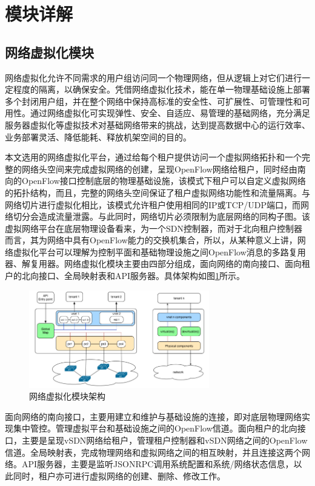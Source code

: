 \section{模块详解}
\subsection{网络虚拟化模块}
网络虚拟化允许不同需求的用户组访问同一个物理网络，但从逻辑上对它们进行一定程度的隔离，以确保安全。凭借网络虚拟化技术，能在单一物理基础设施上部署多个封闭用户组，并在整个网络中保持高标准的安全性、可扩展性、可管理性和可用性。通过网络虚拟化可实现弹性、安全、自适应、易管理的基础网络，充分满足服务器虚拟化等虚拟技术对基础网络带来的挑战，达到提高数据中心的运行效率、业务部署灵活、降低能耗、释放机架空间的目的。

本文选用的网络虚拟化平台，通过给每个租户提供访问一个虚拟网络拓扑和一个完整的网络头空间来完成虚拟网络的创建，呈现OpenFlow网络给租户，同时经由南向的OpenFlow接口控制底层的物理基础设施，该模式下租户可以自定义虚拟网络的拓扑结构，而且，完整的网络头空间保证了租户虚拟网络功能性和流量隔离。与网络切片进行虚拟化相比，该模式允许租户使用相同的IP或TCP/UDP端口，而网络切分会造成流量泄露。与此同时，网络切片必须限制为底层网络的同构子图。该虚拟网络平台在底层物理设备看来，为一个SDN控制器，而对于北向租户控制器而言，其为网络中具有OpenFlow能力的交换机集合，所以，从某种意义上讲，网络虚拟化平台可以理解为控制平面和基础物理设施之间OpenFlow消息的多路复用器、解复用器。网络虚拟化模块主要由四部分组成，面向网络的南向接口、面向租户的北向接口、全局映射表和API服务器。具体架构如图\ref{fig:virtual}所示。

\begin{figure}[!htb]
  \centering
  \includegraphics[width=0.7\textwidth]{logo/virtual-detail.png}
  \caption{网络虚拟化模块架构}
  \label{fig:virtual}
\end{figure}

面向网络的南向接口，主要用建立和维护与基础设施的连接，即对底层物理网络实现集中管控。管理虚拟平台和基础设施之间的OpenFlow信道。面向租户的北向接口，主要是呈现vSDN网络给租户，管理租户控制器和vSDN网络之间的OpenFlow信道。全局映射表，完成物理网络和虚拟网络之间的相互映射，并且连接这两个网络。API服务器，主要是监听JSONRPC调用系统配置和系统/网络状态信息，以此同时，租户亦可进行虚拟网络的创建、删除、修改工作。

